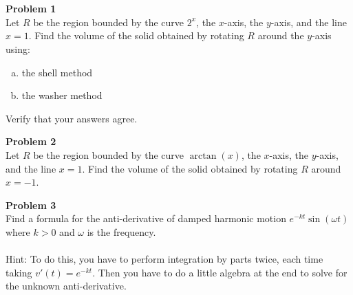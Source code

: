 \documentclass[12pt]{article}
\begin{document}
\\\\

\noindent \textbf{{\large Problem 1}}\\
Let $R$ be the region bounded by the curve $2^x$, the $x$-axis, the
$y$-axis, and the line $x = 1$. Find the volume of the solid obtained
by rotating $R$ around the $y$-axis using:
\indent \begin{enumerate}[(a)]
\item the shell method
\item the washer method
\end{enumerate}
Verify that your answers agree. 

\newpage
\noindent \textbf{{\large Problem 2}}\\
Let $R$ be the region bounded by the curve $\arctan(x)$, the $x$-axis,
the $y$-axis, and the line $x = 1$. Find the volume of the solid
obtained by rotating $R$ around $x = -1$. 

\newpage
\noindent \textbf{{\large Problem 3}}\\
Find a formula for the anti-derivative of damped harmonic motion
$e^{-kt} \sin(\omega t)$ where $k > 0$ and $\omega$ is the
frequency. \\\\
Hint: To do this, you have to perform integration by parts twice, each
time taking $v'(t) = e^{-kt}$. Then you have to do a little algebra at
the end to solve for the unknown anti-derivative. 
\end{document}
